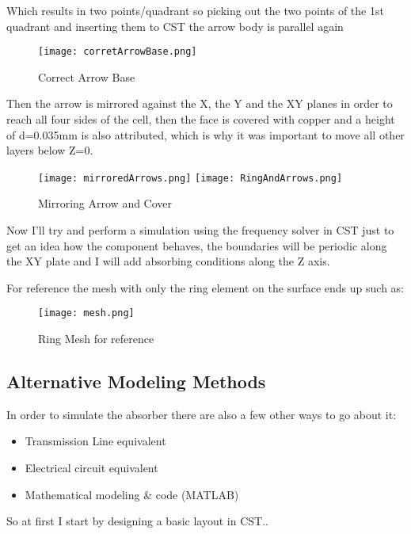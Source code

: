         Which results in two points/quadrant so picking out the two points of the 1st quadrant and 
        inserting them to CST the arrow body is parallel again 
        \begin{figure}[h]
            \centering
            \texttt{[image: corretArrowBase.png]}
            \caption{Correct Arrow Base}
            \label{img:corretArrowBase}
        \end{figure}

        Then the arrow is mirrored against the X, the Y and the XY planes in order to reach all four 
        sides of the cell, then the face is covered with copper and a height of d=0.035mm is also 
        attributed, which is why it was important to move all other layers below Z=0. 
        \begin{figure}[h]
            \centering
            \texttt{[image: mirroredArrows.png]}\hfil
            \texttt{[image: RingAndArrows.png]}
            \caption{Mirroring Arrow and Cover}
            \label{img:mirrorAndCover}
        \end{figure}
        

        Now I'll try and perform a simulation using the frequency solver in CST just to get an idea 
        how the component behaves, the boundaries will be periodic along the XY plate and I will add
        absorbing conditions along the Z axis.

        For reference the mesh with only the ring element on the surface ends up such as: 
        
        \begin{figure}[h]
            \centering
            \texttt{[image: mesh.png]}
            \caption{Ring Mesh for reference}
            \label{img:ringMesh}
        \end{figure}

    \subsection{\textsf{Alternative Modeling Methods}}
        In order to simulate the absorber there are also a few other ways to go about it:
        \begin{itemize}
            \item Transmission Line equivalent
            \item Electrical circuit equivalent
            \item Mathematical modeling \& code (MATLAB)
        \end{itemize}

        So at first I start by designing a basic layout in CST..